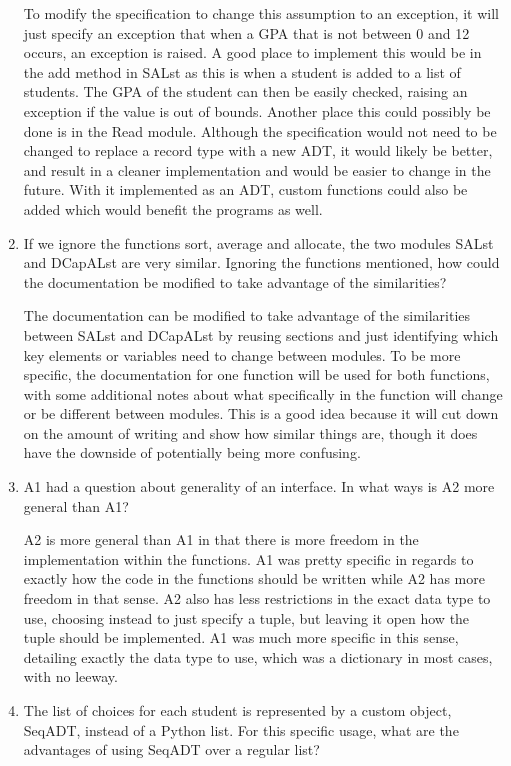 \documentclass[12pt]{article}
\begin{document}
\begin{enumerate}
To modify the specification to change this assumption to an exception, it will just specify an exception that when
a GPA that is not between 0 and 12 occurs, an exception is raised. A good place to implement this would be in
the add method in SALst as this is when a student is added to a list of students. The GPA of the student can then be
easily checked, raising an exception if the value is out of bounds. Another place this could possibly be done is in the
Read module. Although the specification would not need to be changed to replace a record type with a new ADT, it would likely
be better, and result in a cleaner implementation and would be easier to change in the future. With it implemented as an ADT,
custom functions could also be added which would benefit the programs as well.

\item If we ignore the functions sort, average and allocate, the two modules SALst and DCapALst
are very similar. Ignoring the functions mentioned, how could the documentation be modified 
to take advantage of the similarities?

The documentation can be modified to take advantage of the similarities between SALst and DCapALst 
by reusing sections and just identifying which key elements or variables need to change between modules.
To be more specific, the documentation for one function will be used for both functions, with some additional
notes about what specifically in the function will change or be different between modules. This is a good idea because 
it will cut down on the amount of writing and show how similar things are, though it does have the downside of potentially 
being more confusing.

\item A1 had a question about generality of an interface. In what ways is A2 more general
than A1?

A2 is more general than A1 in that there is more freedom in the implementation within the functions.
A1 was pretty specific in regards to exactly how the code in the functions should be written while A2
has more freedom in that sense. A2 also has less restrictions in the exact data type to use, choosing
instead to just specify a tuple, but leaving it open how the tuple should be implemented. A1 was much
more specific in this sense, detailing exactly the data type to use, which was a dictionary in most cases,
with no leeway.

\item The list of choices for each student is represented by a custom object, SeqADT, instead of a
Python list. For this specific usage, what are the advantages of using SeqADT over a regular list?


\end{enumerate}
\end{document}
